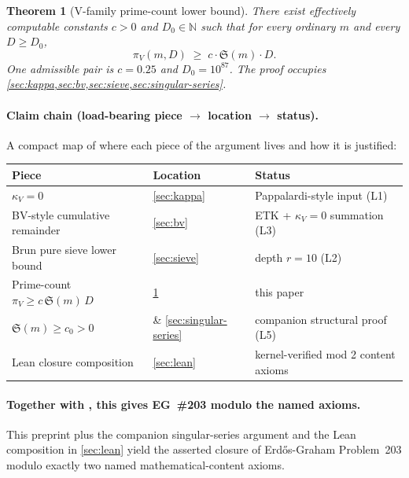 \documentclass[11pt,a4paper]{article}
\theoremstyle{plain}
\newtheorem{theorem}{Theorem}[section]
\theoremstyle{definition}
\theoremstyle{remark}
\begin{document}

\begin{theorem}[V-family prime-count lower bound]\label{thm:main}
There exist effectively computable constants $c > 0$ and
$D_{0} \in \mathbb{N}$ such that for every ordinary $m$ and every
$D \geq D_{0}$,
\[
  \pi_{V}(m, D) \;\geq\; c \cdot \mathfrak{S}(m) \cdot D.
\]
One admissible pair is $c = 0.25$ and $D_{0} = 10^{87}$. The proof
occupies \cref{sec:kappa,sec:bv,sec:sieve,sec:singular-series}.
\end{theorem}

\paragraph{Claim chain (load-bearing piece $\to$ location $\to$ status).}
A compact map of where each piece of the argument lives and how
it is justified:

\begin{center}\small
\begin{tabular}{lll}
\hline
Piece & Location & Status \\
\hline
$\kappa_V = 0$ & \cref{sec:kappa} & Pappalardi-style input (L1) \\
BV-style cumulative remainder & \cref{sec:bv} & ETK + $\kappa_V=0$ summation (L3) \\
Brun pure sieve lower bound & \cref{sec:sieve} & depth $r = 10$ (L2) \\
Prime-count $\pi_V \geq c\,\mathfrak{S}(m)\,D$ & \cref{thm:main} & this paper \\
$\mathfrak{S}(m) \geq c_0 > 0$ & \cite{WilderChain103} \& \cref{sec:singular-series} & companion structural proof (L5) \\
Lean closure composition & \cref{sec:lean} & kernel-verified mod 2 content axioms \\
\hline
\end{tabular}
\end{center}

\paragraph{Together with \cite{WilderChain103}, this gives EG~\#203 modulo the named axioms.}
This preprint plus the companion singular-series argument and the
Lean composition in \cref{sec:lean} yield the asserted closure
of Erd\H{o}s-Graham Problem~203 modulo exactly two named
mathematical-content axioms.
\end{document}
